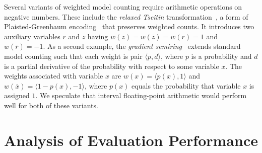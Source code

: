 \documentclass[letterpaper,USenglish,cleveref, autoref, thm-restate]{lipics-v2021}
\newcommand{\obar}[1]{\overline{#1}}
\begin{document}
Several variants of weighted model counting require
arithmetic operations on negative numbers.  These
include the \emph{relaxed Tseitin}
transformation~\cite{meert:starai:2016},  a form
of Plaisted-Green\-baum encoding~\cite{plaisted:jsc:1986} that preserves
weighted counts.  It introduces two auxiliary variables $r$ and $z$ having
$w(z) = w(\obar{z}) = w(r) = 1$ and $w(\obar{r}) = -1$.
As a second example, the \emph{gradient
semiring}~\cite{eisner:acl:2002, kimmig:jal:2017} extends standard
model counting such that each weight is pair $\langle p, d \rangle$,
where $p$ is a probability and $d$ is a partial derivative of the
probability with respect to some variable $x$.  The weights
associated with variable $x$ are $w(x) = \langle p(x), 1\rangle$ and
$w(\obar{x}) = \langle 1-p(x), -1\rangle$, where $p(x)$ equals the probability that variable $x$ is assigned $1$.
We speculate that interval floating-point arithmetic would perform well for both of these variants.



\newpage


\newpage
\appendix

\section{Analysis of Evaluation Performance}
\label{app:performance}
\end{document}
